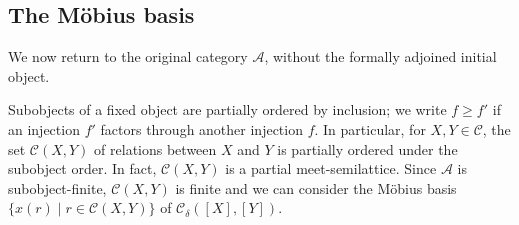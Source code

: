 \documentclass[11pt]{amsart}
\theoremstyle{definition}
\theoremstyle{remark}
\newcommand\cA{\mathcal A}
\newcommand\cC{\mathcal C}
\renewcommand\:\colon
\renewcommand\:\colon
\begin{document}
\subsection{The Möbius basis}

We now return to the original category $\cA$, without the formally adjoined initial object.

Subobjects of a fixed object are partially ordered by inclusion; we write
$f \geqslant f'$ if an injection $f'$ factors through another injection $f$. In particular, for $X, Y \in \cC$, the set $\cC(X, Y)$ of relations between $X$ and $Y$ is
partially ordered under the subobject order. In fact, $\cC(X, Y)$ is a
partial meet-semilattice. Since $\cA$ is subobject-finite, $\cC(X, Y)$ is finite and we can
consider the Möbius basis $\{x(r) \mid r \in \cC(X, Y)\}$ of $\cC_\delta([X],
[Y])$.
\end{document}
